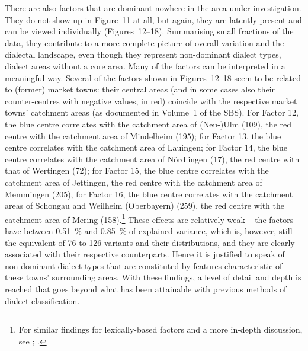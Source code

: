 \documentclass[output=paper]{LSP/langsci}
\begin{document}
There are also factors that are dominant nowhere in the area under investigation. They do not show up in Figure~11 at all, but again, they are latently present and can be viewed individually (Figures~12–18). Summarising small fractions of the data, they contribute to a more complete picture of overall variation and the dialectal landscape, even though they represent non-dominant dialect types, dialect areas without a core area. Many of the factors can be interpreted in a meaningful way. Several of the factors shown in Figures~12–18 seem to be related to (former) market towns: their central areas (and in some cases also their counter-centres with negative values, in red) coincide with the respective market towns’ catchment areas (as documented in Volume~1 of the SBS). For Factor 12, the blue centre correlates with the catchment area of (Neu-)Ulm (109), the red centre with the catchment area of Mindelheim (195); for Factor 13, the blue centre correlates with the catchment area of Lauingen; for Factor 14, the blue centre correlates with the catchment area of Nördlingen (17), the red centre with that of Wertingen (72); for Factor 15, the blue centre correlates with the catchment area of Jettingen, the red centre with the catchment area of Memmingen (205), for Factor 16, the blue centre correlates with the catchment areas of Schongau and Weilheim (Oberbayern) (259), the red centre with the catchment area of Mering (158).\footnote{For similar findings for lexically-based factors and a more in-depth discussion, see \citet[170--196]{pickl_probabilistische_2013}; \citet{buhler_dialektraume_2014}.} These effects are relatively weak – the factors have between 0.51~\% and 0.85~\% of explained variance, which is, however, still the equivalent of 76 to 126 variants and their distributions, and they are clearly associated with their respective counterparts. Hence it is justified to speak of non-dominant dialect types that are constituted by features characteristic of these towns’ surrounding areas. With these findings, a level of detail and depth is reached that goes beyond what has been attainable with previous methods of dialect classification.
\end{document}
